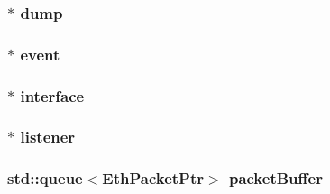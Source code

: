 \label{classEtherTap_a5d346a4e5fa3df29a43d150d99c8a02a}
\hypertarget{classEtherTap_ad5a0f1baca11c9598fdb6996bd03ac8c}{
\subsubsection[{dump}]{$\ast$ {\bf dump}}}
\label{classEtherTap_ad5a0f1baca11c9598fdb6996bd03ac8c}
\hypertarget{classEtherTap_afe2f4b98936d4a983d2fdf5a87b0a35a}{
\subsubsection[{event}]{$\ast$ {\bf event}}}
\label{classEtherTap_afe2f4b98936d4a983d2fdf5a87b0a35a}
\hypertarget{classEtherTap_a30919c26a7c1ead7f6051857f09166b9}{
\subsubsection[{interface}]{$\ast$ {\bf interface}}}
\label{classEtherTap_a30919c26a7c1ead7f6051857f09166b9}
\hypertarget{classEtherTap_a63f477b36e686c92354d58f1c89733e4}{
\subsubsection[{listener}]{$\ast$ {\bf listener}}}
\label{classEtherTap_a63f477b36e686c92354d58f1c89733e4}
\hypertarget{classEtherTap_a64872f3fc85b752e1d265c01ae4efc14}{
\subsubsection[{packetBuffer}]{\setlength{\rightskip}{0pt plus 5cm}std::queue$<${\bf EthPacketPtr}$>$ {\bf packetBuffer}}}

